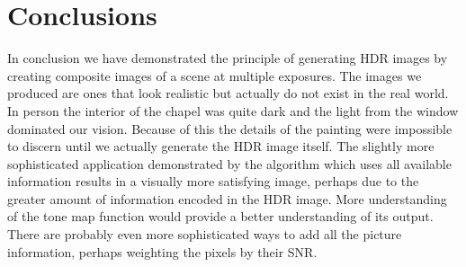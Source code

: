 \documentclass[a4paper]{article}
\begin{document}
\section{Conclusions}
In conclusion we have demonstrated the principle of generating HDR images by creating composite images of a scene at multiple exposures.  The images we produced are ones that look realistic but actually do not exist in the real world.  In person the interior of the chapel was quite dark and the light from the window dominated our vision.  Because of this the details of the painting were impossible to discern until we actually generate the HDR image itself.  The slightly more sophisticated application demonstrated by the algorithm which uses all available information results in a visually more satisfying image, perhaps due to the greater amount of information encoded in the HDR image. More understanding of the tone map function would provide a better understanding of its output.  There are probably even more sophisticated ways to add all the picture information, perhaps weighting the pixels by their SNR.  

\end{document}
